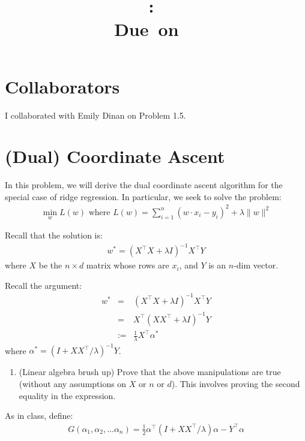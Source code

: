 \documentclass{article}
\title{
    \vspace{2in}
    \textmd{\textbf{\hmwkClass:\ \hmwkTitle}}\\
    \normalsize\vspace{0.1in}\small{Due\ on\ \hmwkDueDate\ }\\
    \vspace{3in}
}
\author{\textbf{\hmwkAuthorName}}
\date{}
\begin{document}
\maketitle

\pagebreak

\section*{Collaborators}
I collaborated with Emily Dinan on Problem 1.5.



\section{(Dual) Coordinate Ascent}


In this problem, we will derive the dual coordinate ascent algorithm for the special case of ridge regression. In particular, we seek to solve the problem:
\begin{align}
	\min_w L(w) \textrm{ where } L(w)= \sum_{i=1}^n (w\cdot x_i - y_i)^2 + \lambda \|w\|^2
\end{align}

Recall that the solution is:
\begin{align}
	w^* = (X^\top X+\lambda I)^{-1} X^\top Y
\end{align}
where $X$ be the $n\times d$ matrix whose rows are $x_i$, and $Y$ is an $n$-dim vector.

Recall the argument:
\begin{eqnarray*}
	w^* & = &  (X^\top X+\lambda I)^{-1} X^\top Y\\
	 & = &  X^\top (X X^\top+\lambda I)^{-1} Y\\
	 & := &  \frac{1}{\lambda} X^\top \alpha^*
\end{eqnarray*}
where $\alpha^* = (I+XX^\top/ \lambda )^{-1} Y$.

\begin{enumerate}
	\item (Linear algebra brush up) Prove that the above manipulations are true (without any assumptions on $X$ or $n$ or $d$). This involves proving the second equality in the expression.
\end{enumerate}

As in class, define:
\begin{align}
	G(\alpha_1, \alpha_2, \ldots \alpha_n) = \frac{1}{2} \alpha^\top
	(I+XX^\top/ \lambda ) \alpha - Y^\top \alpha
\end{align}
\end{document}
